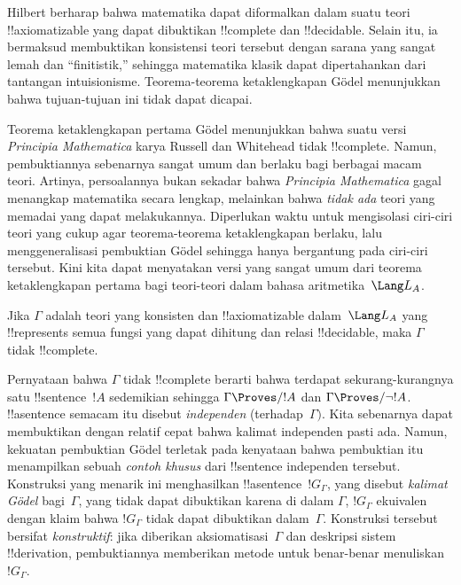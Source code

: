 \documentclass[../../../include/open-logic-section]{subfiles}
\begin{document}


Hilbert berharap bahwa matematika dapat diformalkan dalam suatu teori
!!{axiomatizable} yang dapat dibuktikan !!{complete} dan
!!{decidable}. Selain itu, ia bermaksud membuktikan konsistensi teori
tersebut dengan sarana yang sangat lemah dan ``finitistik,'' sehingga matematika
klasik dapat dipertahankan dari tantangan intuisionisme. Teorema-teorema
ketaklengkapan G\"odel menunjukkan bahwa tujuan-tujuan ini tidak dapat dicapai.

Teorema ketaklengkapan pertama G\"odel menunjukkan bahwa suatu versi
\emph{Principia Mathematica} karya Russell dan Whitehead tidak
!!{complete}. Namun, pembuktiannya sebenarnya sangat umum dan berlaku bagi
berbagai macam teori. Artinya, persoalannya bukan sekadar bahwa
\emph{Principia Mathematica} gagal menangkap matematika secara lengkap,
melainkan bahwa \emph{tidak ada} teori yang memadai yang dapat melakukannya.
Diperlukan waktu untuk mengisolasi ciri-ciri teori yang cukup agar
teorema-teorema ketaklengkapan berlaku, lalu menggeneralisasi pembuktian
G\"odel sehingga hanya bergantung pada ciri-ciri tersebut. Kini kita dapat
menyatakan versi yang sangat umum dari teorema ketaklengkapan pertama bagi
teori-teori dalam bahasa aritmetika~$\Lang L_A$.

\begin{thm}
Jika $\Gamma$ adalah teori yang konsisten dan !!{axiomatizable} dalam~$\Lang
L_A$ yang !!{represents} semua fungsi yang dapat dihitung dan relasi
!!{decidable}, maka $\Gamma$ tidak !!{complete}.
\end{thm}

Pernyataan bahwa $\Gamma$ tidak !!{complete} berarti bahwa terdapat
sekurang-kurangnya satu !!{sentence}~$!A$ sedemikian sehingga $\Gamma
\Proves/ !A$ dan $\Gamma \Proves/ \lnot !A$. !!a{sentence} semacam itu
disebut \emph{independen} (terhadap~$\Gamma)$. Kita sebenarnya dapat
membuktikan dengan relatif cepat bahwa kalimat independen pasti ada. Namun,
kekuatan pembuktian G\"odel terletak pada kenyataan bahwa pembuktian itu
menampilkan sebuah \emph{contoh khusus} dari !!{sentence} independen
tersebut. Konstruksi yang menarik ini menghasilkan !!a{sentence}~$!G_\Gamma$,
yang disebut \emph{kalimat G\"odel} bagi~$\Gamma$, yang tidak dapat dibuktikan
karena di dalam $\Gamma$, $!G_\Gamma$ ekuivalen dengan klaim bahwa
$!G_\Gamma$ tidak dapat dibuktikan dalam~$\Gamma$. Konstruksi tersebut
bersifat \emph{konstruktif}: jika diberikan aksiomatisasi~$\Gamma$ dan
deskripsi sistem !!{derivation}, pembuktiannya memberikan metode untuk
benar-benar menuliskan~$!G_\Gamma$.
\end{document}
